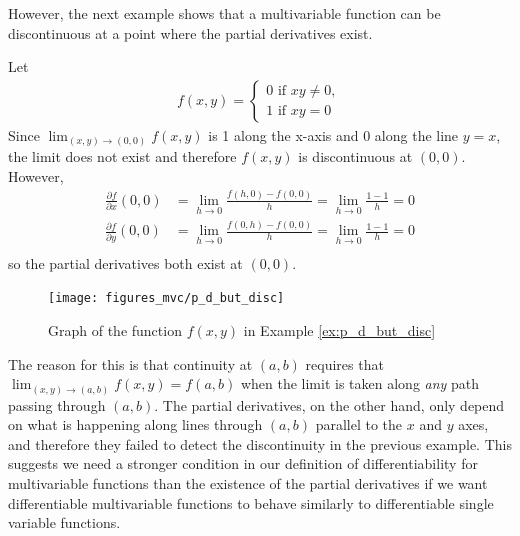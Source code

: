 \documentclass[12pt,letterpaper,reqno]{article}
\numberwithin{equation}{section}
\begin{document}
{However, the next example shows that a multivariable function can be discontinuous at a point where the partial derivatives exist.

\begin{example}\label{ex:p_d_but_disc}
	Let
	\begin{align*}
		f(x,y)=\begin{cases}
			0 \text{ if } xy \neq 0, \\
			1 \text{ if } xy=0
		\end{cases}
	\end{align*}
Since $\lim_{(x,y) \to (0,0)}f(x,y)$ is 1 along the x-axis and $0$ along the line $y=x$, the limit does not exist and therefore $f(x,y)$ is discontinuous at $(0,0)$. However,
	\begin{align*}
		\frac{\partial f}{\partial x}(0,0)&=\lim_{h \to 0}\frac{f(h,0)-f(0,0)}{h}=\lim_{h \to 0}\frac{1-1}{h}=0 \\
		\frac{\partial f}{\partial y}(0,0)&=\lim_{h \to 0}\frac{f(0,h)-f(0,0)}{h}=\lim_{h \to 0}\frac{1-1}{h}=0 \\
	\end{align*}
so the partial derivatives both exist at $(0,0)$. 
\begin{figure}[h]
	\begin{center}
		\texttt{[image: figures\_mvc/p\_d\_but\_disc]}
	\end{center}
	\caption{Graph of the function $f(x,y)$ in Example \ref{ex:p_d_but_disc}}
\end{figure}
\end{example}
The reason for this is that continuity at $(a,b)$ requires that $\lim_{(x,y) \to (a,b)}f(x,y)=f(a,b)$ when the limit is taken along \emph{any} path passing through $(a,b)$. The partial derivatives, on the other hand, only depend on what is happening along lines through $(a,b)$ parallel to the $x$ and $y$ axes, and therefore they failed to detect the discontinuity in the previous example. This suggests we need a stronger condition in our definition of differentiability for multivariable functions than the existence of the partial derivatives if we want differentiable multivariable functions to behave similarly to differentiable single variable functions.

}
\end{document}
